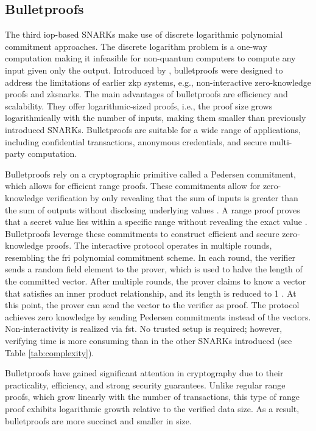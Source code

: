 \subsection{Bulletproofs}
The third \acrshort{iop}-based SNARKs make use of discrete logarithmic polynomial commitment approaches. The discrete logarithm problem is a one-way computation making it infeasible for non-quantum computers to compute any input given only the output. Introduced by \citet{bulletproofs}, bulletproofs were designed to address the limitations of earlier \acrshort{zkp} systems, e.g., non-interactive zero-knowledge proofs and \acrshort{zksnark}s. The main advantages of bulletproofs are efficiency and scalability. They offer logarithmic-sized proofs, i.e., the proof size grows logarithmically with the number of inputs, making them smaller than previously introduced SNARKs. Bulletproofs are suitable for a wide range of applications, including confidential transactions, anonymous credentials, and secure multi-party computation.

Bulletproofs rely on a cryptographic primitive called a Pedersen commitment, which allows for efficient range proofs. These commitments allow for zero-knowledge verification by only revealing that the sum of inputs is greater than the sum of outputs without disclosing underlying values \citep{rangepedersen}. A range proof proves that a secret value lies within a specific range without revealing the exact value \citep{Chung2022BulletproofsSP}. Bulletproofs leverage these commitments to construct efficient and secure zero-knowledge proofs. The interactive protocol operates in multiple rounds, resembling the \acrshort{fri} polynomial commitment scheme. In each round, the verifier sends a random field element to the prover, which is used to halve the length of the committed vector. After multiple rounds, the prover claims to know a vector that satisfies an inner product relationship, and its length is reduced to 1 \citep{Thaler, Godden}. At this point, the prover can send the vector to the verifier as proof. The protocol achieves zero knowledge by sending Pedersen commitments instead of the vectors. Non-interactivity is realized via \acrshort{fst}. No trusted setup is required; however, verifying time is more consuming than in the other SNARKs introduced (see Table \ref{tab:complexity}). 

Bulletproofs have gained significant attention in cryptography due to their practicality, efficiency, and strong security guarantees. Unlike regular range proofs, which grow linearly with the number of transactions, this type of range proof exhibits logarithmic growth relative to the verified data size. As a result, bulletproofs are more succinct and smaller in size.


